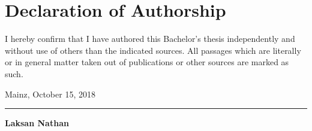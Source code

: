 
\section*{Declaration of Authorship}

I hereby confirm that I have authored this Bachelor's
thesis independently and without use of others than the indicated
sources. All passages which are literally or in general matter
taken out of publications or other sources are marked as such.
\vspace{0.5cm}

Mainz, October 15, 2018 \vspace{1.5cm} 


\noindent\rule{9cm}{0.5pt} \vspace{0.1cm}

\bf{Laksan Nathan}